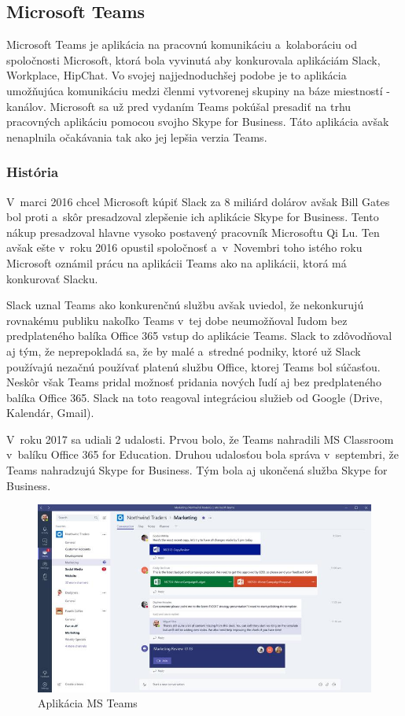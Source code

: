 \subsection{Microsoft Teams}
\indent Microsoft Teams je aplikácia na pracovnú komunikáciu a kolaboráciu od spoločnosti Microsoft, ktorá bola vyvinutá aby konkurovala aplikáciám Slack, Workplace, HipChat. Vo svojej najjednoduchšej podobe je to aplikácia umožňujúca komunikáciu medzi členmi vytvorenej skupiny na báze miestností - kanálov. Microsoft sa už pred vydaním Teams pokúšal presadiť na trhu pracovných aplikáciu pomocou svojho Skype for Business. Táto aplikácia avšak nenaplnila očakávania tak ako jej lepšia verzia Teams. 
\subsubsection{História}
\indent V marci 2016 chcel Microsoft kúpiť Slack za 8 miliárd dolárov avšak Bill Gates bol proti a skôr presadzoval zlepšenie ich aplikácie Skype for Business. Tento nákup presadzoval hlavne vysoko postavený pracovník Microsoftu Qi Lu. Ten avšak ešte v roku 2016 opustil spoločnosť a v Novembri toho istého roku Microsoft oznámil prácu na aplikácii Teams ako na aplikácii, ktorá má konkurovať Slacku. 

\indent Slack uznal Teams ako konkurenčnú službu avšak uviedol, že nekonkurujú rovnakému publiku nakoľko Teams v tej dobe neumožňoval ľudom bez predplateného balíka Office 365 vstup do aplikácie Teams. Slack to zdôvodňoval aj tým, že neprepokladá sa, že by malé a stredné podniky, ktoré už Slack používajú nezačnú používať platenú službu Office, ktorej Teams bol súčasťou. Neskôr však Teams pridal možnosť pridania nových ľudí aj bez predplateného balíka Office 365. Slack na toto reagoval integráciou služieb od Google (Drive, Kalendár, Gmail). 

\indent V roku 2017 sa udiali 2 udalosti. Prvou bolo, že Teams nahradili MS Classroom v balíku Office 365 for Education. Druhou udalosťou bola správa v septembri, že Teams nahradzujú Skype for Business. Tým bola aj ukončená služba Skype for Business. 

\begin{figure}[H]
    \centering
    \includegraphics[scale=0.70]{img/obr-ms-teams.jpg}
    \caption{Aplikácia MS Teams}
    \label{fig:img-ms-teams}
\end{figure}

